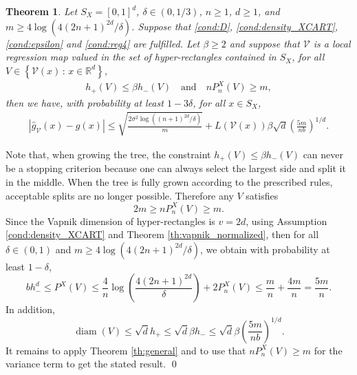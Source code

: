 \documentclass[paper=a4, fontsize=11pt]{scrartcl}
\newcommand{\diam}{\operatorname{diam}}
\newtheorem{theorem}{Theorem}
\begin{document}
\begin{theorem}\label{th_cart_like}
Let $S_X=[0,1]^d$, $\delta \in (0,1/3) $, $n\geq 1$, $d\geq 1$, and $m\geq 4\log(4(2n+1)^{2d}/\delta )$. Suppose that \ref{cond:D}, \ref{cond:density_XCART}, \ref{cond:epsilon} and \ref{cond:reg4} are fulfilled. Let $\beta \geq 2$ and suppose that $\mathcal V$ is a local regression map valued in the set of hyper-rectangles contained in $S_X$, for all $V\in \left\{ \mathcal V(x) \, :\, x\in \mathbb R^d \right\}$,
    \begin{align*}
        h_+(V) \leq \beta h_- (V)
\quad \text{and}\quad 
       n P_n^X( V) \geq  m,
    \end{align*}
    then we have, with probability at least $1-3\delta$, for all $x \in S_X$,
    \begin{align*} 
            |  \hat g_\mathcal V (x) - g(x)  | \leq \sqrt { \frac{2 \sigma ^2 \log((n+1) ^{2d}/\delta) } {  m}} + L(\mathcal{V}(x)) \beta \sqrt{d} \left(\frac{5 m}{ n b}\right)^{1/d}.
    \end{align*}
    
\end{theorem}

    Note that,  when growing the tree, the constraint $h_+(V) \leq \beta h_- (V) $ can never be a stopping criterion because one can always select the largest side and split it in the middle.
    When the tree is fully grown according to the prescribed rules,  acceptable splits are no longer possible. Therefore any $V $ satisfies 
    $$ 2 m \geq   nP_n^X(V) \geq  m.$$
Since the Vapnik dimension of hyper-rectangles is $ v = 2d$, using Assumption \ref{cond:density_XCART} and Theorem \ref{th:vapnik_normalized}, then for all $\delta \in (0,1)$ and $m\geq 4\log(4(2n+1)^{2d}/\delta )$, we obtain with probability at least $1 - \delta$,
$$b h_-^d \leq P^X(V) \leq \dfrac{4}{n} \log\left(\dfrac{4(2n+1)^{2d}}{\delta} \right) + 2 P_n^X(V) \leq \frac{m}{n} + \frac{4m}{n} = \frac{5m}{n}.$$
 In addition,
$$\diam(V) \leq \sqrt{d} h_+ \leq \sqrt{d} \beta h_- \leq  \sqrt{d} \beta \left(\dfrac{5 m}{n b}\right)^{1/d}.$$
It remains to apply Theorem \ref{th:general} and to use that $n P_n^X(V) \geq m$ for the variance term to get the stated result.
\qed
\end{document}
